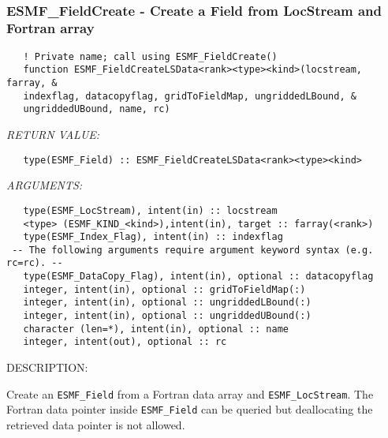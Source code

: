 \mbox{}\hrulefill\ 
 
\subsubsection [ESMF\_FieldCreate] {ESMF\_FieldCreate - Create a Field from LocStream and Fortran array }


   
\begin{verbatim}   ! Private name; call using ESMF_FieldCreate() 
   function ESMF_FieldCreateLSData<rank><type><kind>(locstream, farray, & 
   indexflag, datacopyflag, gridToFieldMap, ungriddedLBound, & 
   ungriddedUBound, name, rc) 
   \end{verbatim}{\em RETURN VALUE:}
\begin{verbatim}   type(ESMF_Field) :: ESMF_FieldCreateLSData<rank><type><kind> 
   \end{verbatim}{\em ARGUMENTS:}
\begin{verbatim}   type(ESMF_LocStream), intent(in) :: locstream 
   <type> (ESMF_KIND_<kind>),intent(in), target :: farray(<rank>) 
   type(ESMF_Index_Flag), intent(in) :: indexflag 
 -- The following arguments require argument keyword syntax (e.g. rc=rc). --
   type(ESMF_DataCopy_Flag), intent(in), optional :: datacopyflag 
   integer, intent(in), optional :: gridToFieldMap(:) 
   integer, intent(in), optional :: ungriddedLBound(:) 
   integer, intent(in), optional :: ungriddedUBound(:) 
   character (len=*), intent(in), optional :: name 
   integer, intent(out), optional :: rc 
   \end{verbatim}
{\sf DESCRIPTION:\\ }

 
   \begin{sloppypar} 
   Create an {\tt ESMF\_Field} from a Fortran data array and {\tt ESMF\_LocStream}. 
   The Fortran data pointer inside {\tt ESMF\_Field} can be queried but deallocating 
   the retrieved data pointer is not allowed. 
   \end{sloppypar} 
   
